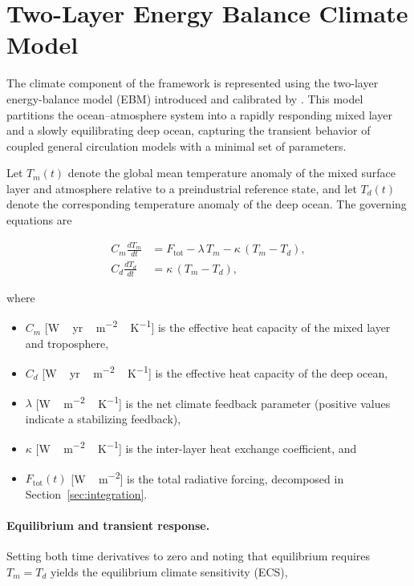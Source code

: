 \documentclass[12pt]{article}
\newcommand{\ddt}[1]{\frac{d#1}{dt}}
\newcommand{\Ftot}{F_{\mathrm{tot}}}
\begin{document}
\section{Two-Layer Energy Balance Climate Model}
\label{sec:climate}

The climate component of the framework is represented using the two-layer
energy-balance model (EBM) introduced and calibrated by \citet{Geoffroy2013}.
This model partitions the ocean--atmosphere system into a rapidly responding
mixed layer and a slowly equilibrating deep ocean, capturing the transient
behavior of coupled general circulation models with a minimal set of parameters.

Let $T_m(t)$ denote the global mean temperature anomaly of the mixed surface
layer and atmosphere relative to a preindustrial reference state, and let
$T_d(t)$ denote the corresponding temperature anomaly of the deep ocean.  The
governing equations are

\begin{align}
  C_m \ddt{T_m} &= \Ftot - \lambda\, T_m - \kappa\,(T_m - T_d),
  \label{eq:Tm}\\[4pt]
  C_d \ddt{T_d} &= \kappa\,(T_m - T_d),
  \label{eq:Td}
\end{align}

where
\begin{itemize}
  \item $C_m$ [\si{W\,yr\,m^{-2}\,K^{-1}}] is the effective heat capacity of
        the mixed layer and troposphere,
  \item $C_d$ [\si{W\,yr\,m^{-2}\,K^{-1}}] is the effective heat capacity of
        the deep ocean,
  \item $\lambda$ [\si{W\,m^{-2}\,K^{-1}}] is the net climate feedback parameter
        (positive values indicate a stabilizing feedback),
  \item $\kappa$ [\si{W\,m^{-2}\,K^{-1}}] is the inter-layer heat exchange
        coefficient, and
  \item $\Ftot(t)$ [\si{W\,m^{-2}}] is the total radiative forcing, decomposed
        in Section~\ref{sec:integration}.
\end{itemize}

\paragraph{Equilibrium and transient response.}
Setting both time derivatives to zero and noting that equilibrium requires
$T_m = T_d$ yields the equilibrium climate sensitivity (ECS),
\end{document}
